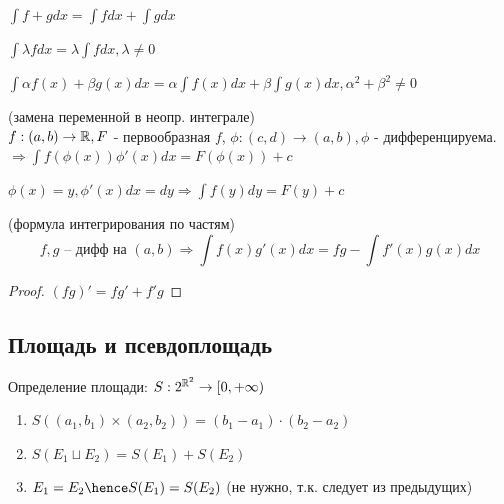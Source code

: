 \begin{properties}
    \item $\int f + g dx = \int f dx + \int g dx$
    
    \item $\int \lambda f dx = \lambda \int f dx, \lambda \neq 0$
        
    \item $\int \alpha f(x) + \beta g(x) dx = \alpha \int f(x) dx + \beta \int g(x) dx, \alpha^2 + \beta^2 \neq 0$
        
    \item (замена переменной в неопр. интеграле) \\
    $f : (a, b) \rightarrow \mathbb{R}, F$ - первообразная $f$, $\phi:(c, d) \rightarrow (a, b), 
    \phi$ - дифференцируема. \\
    $\Rightarrow \int f(\phi(x))\phi'(x) dx = F(\phi(x)) + c$
    \begin{remark}
        $\phi(x) = y, \phi'(x)dx = dy \Rightarrow \int f(y) dy = F(y) + c$
    \end{remark}

    \item(формула интегрирования по частям) \\
    \[f, g\text{ -- дифф на }(a, b) \Rightarrow \int f(x)g'(x)dx = fg - \int f'(x)g(x)dx\]
    \begin{proof}
        $(fg)' = fg' + f'g$
    \end{proof}

\end{properties}




\subsection{Площадь и псевдоплощадь}

\begin{definition}
    Определение площади: $S : 2 ^ {\mathbb{R} ^ 2} \rightarrow [0, +\infty)$
    \begin{enumerate}
        \item $S((a_1, b_1) \times (a_2, b_2)) = (b_1 - a_1) \cdot (b_2 - a_2)$
        \item $S(E_1 \sqcup E_2) = S(E_1) + S(E_2)$
        \item \sout{$E_1 = E_2 \hence S(E_1) = S(E_2)$} (не нужно, т.к. следует из предыдущих)
    \end{enumerate}
\end{definition}

